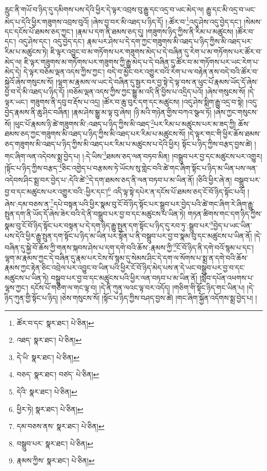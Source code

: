 རླུང་ནི་གཡོ་བ་ཉིད་དུ་དམིགས་པས་དེའི་ཕྱིར་དེ་ལྟར་འབྲས་བུ་རྒྱུ་དང་འདྲ་བ་ཡང་མེད་ལ། རྒྱུ་དང་མི་འདྲ་བ་ཡང་མེད་པ་དེའི་ཕྱིར་གཟུགས་འབྲས་བུའོ། །ཞེས་བྱ་བར་མི་འཐད་པ་ཉིད་དོ། །:ཚོར་བ་\footnote{ཚོར་བ་དང་  སྣར་ཐང་།  པེ་ཅིན། }འདུ་ཤེས་འདུ་བྱེད་དང་། །སེམས་དང་དངོས་པོ་ཐམས་ཅད་ཀྱང་། །རྣམ་པ་དག་ནི་ཐམས་ཅད་དུ། །གཟུགས་ཉིད་ཀྱིས་ནི་རིམ་པ་མཚུངས། །ཚོར་བ་དང་། འདུ་ཤེས་དང་། འདུ་བྱེད་དང་། རྣམ་པར་ཤེས་པ་དེ་དག་ཀྱང་གཟུགས་མི་འཐད་པ་ཉིད་ཀྱིས་མི་འཐད་པར་རིམ་པ་མཚུངས་ཏེ། ཇི་ལྟར་འབྱུང་བ་མ་གཏོགས་པར་གཟུགས་མེད་པ་དེ་བཞིན་དུ་རེག་པ་མ་གཏོགས་པར་ཚོར་བ་མེད་ལ། ཇི་ལྟར་གཟུགས་མ་གཏོགས་པར་གཟུགས་ཀྱི་རྒྱུ་མེད་པ་དེ་བཞིན་དུ་ཚོར་བ་མ་གཏོགས་པར་ཡང་རེག་པ་མེད་དེ། དེ་ལྟར་བཅོམ་ལྡན་འདས་ཀྱིས་ཀྱང་། བདེ་བ་མྱོང་བར་འགྱུར་བའི་རེག་པ་ལ་བརྟེན་ནས་བདེ་བའི་ཚོར་བ་སྐྱེའོ་ཞེས་གསུངས་སོ། །ལྷག་མ་རྣམས་ལ་ཡང་དེ་བཞིན་དུ་སྦྱར་བར་བྱ་སྟེ་དེ་ལྟ་བས་ན་ཕུང་པོ་རྣམས་ཡོད་དོ་ཞེས་བྱ་བ་དེ་མི་འཐད་པ་ཉིད་དོ། །བཅོམ་ལྡན་འདས་ཀྱིས་ཀྱང་སྒྱུ་མ་འདི་ནི་བྱིས་པ་འདྲིད་པའོ། །ཞེས་གསུངས་སོ། །དེ་ལྟར་ཡང་། གཟུགས་ནི་དབུ་བ་རྡོས་པ་འདྲ། །ཚོར་བ་ཆུ་བུར་དག་དང་མཚུངས། །འདུ་ཤེས་སྨིག་རྒྱུ་འདྲ་བ་སྟེ། །འདུ་བྱེད་རྣམས་ནི་ཆུ་ཤིང་བཞིན། །རྣམ་ཤེས་སྒྱུ་མ་ལྟ་བུ་ཞེས། །ཉི་མའི་གཉེན་གྱིས་བཀའ་སྩལ་ཏོ། །ཞེས་ཀྱང་གསུངས་སོ། །ཕུང་པོ་རྣམས་ཉི་ཚེ་གཟུགས་མི་:འཐད་པ་ཉིད་ཀྱིས་མི་འཐད་\footnote{འཐད་  སྣར་ཐང་།  པེ་ཅིན། }པར་རིམ་པ་མཚུངས་པར་མ་ཟད་ཀྱི། ཆོས་ཐམས་ཅད་ཀྱང་གཟུགས་མི་འཐད་པ་ཉིད་ཀྱིས་མི་འཐད་པར་རིམ་པ་མཚུངས་སོ། །དེ་ལྟར་གང་གི་ཕྱིར་ཆོས་ཐམས་ཅད་གཟུགས་མི་འཐད་པ་ཉིད་ཀྱིས་མི་འཐད་པར་རིམ་པ་མཚུངས་པ་དེའི་ཕྱིར། སྟོང་པ་ཉིད་ཀྱིས་བརྩད་བྱས་ཚེ། །གང་ཞིག་ལན་འདེབས་སྨྲ་བྱེད་པ། །:དེ་ཡིས་\footnote{དེ་ཡི་  སྣར་ཐང་།  པེ་ཅིན། }ཐམས་ཅད་ལན་བཏབ་མིན། །བསྒྲུབ་པར་བྱ་དང་མཚུངས་པར་འགྱུར། །སྟོང་པ་ཉིད་ཀྱིས་བརྩད་\footnote{བཅད་  སྣར་ཐང་། བཙད་  པེ་ཅིན། }ཅིང་འགྱེད་པ་བརྩམས་ཏེ་ཡོངས་སུ་གླེང་བའི་ཚེ་གང་ཞིག་སྟོང་པ་ཉིད་མ་ཡིན་པས་ལན་འདེབས་ཤིང་སྨྲ་བར་བྱེད་པ་:དེའི་ཚེ་\footnote{དེའི་  སྣར་ཐང་།  པེ་ཅིན། }དེ་དག་ཐམས་ཅད་ནི་ལན་བཏབ་པ་མ་ཡིན་ནོ། །ཅིའི་ཕྱིར་ཞེ་ན། བསྒྲུབ་པར་བྱ་བ་དང་མཚུངས་པར་འགྱུར་བའི་:ཕྱིར་དང་།\footnote{ཕྱིར་ཏེ།  སྣར་ཐང་།  པེ་ཅིན། } འདི་ལྟ་སྟེ་དཔེར་ན་དངོས་པོ་ཐམས་ཅད་ངོ་བོ་ཉིད་སྟོང་པའོ། །ཞེས་:དམ་བཅས་ན་\footnote{དམ་བཅས་ནས་  སྣར་ཐང་།  པེ་ཅིན། }དཔེ་བསྟན་པའི་ཕྱིར་སྣམ་བུ་ངོ་བོ་ཉིད་སྟོང་པར་སྒྲུབ་པར་བྱེད་པའི་ཚེ་གང་ཞིག་རེ་ཞིག་རྒྱུ་སྤུན་དག་ནི་ཡོད་དོ་ཞེས་ཟེར་བའི་དེ་ནི་བསྒྲུབ་པར་བྱ་བ་དང་མཚུངས་པ་ཡིན་ཏེ། གཏན་ཚིགས་གང་དག་ཉིད་ཀྱིས་སྣམ་བུ་ངོ་བོ་ཉིད་སྟོང་པར་བསྟན་པ་དེ་དག་ཉིད་རྒྱུ་སྤུན་དག་སྟོང་པ་ཉིད་དུ་རབ་ཏུ་:སྒྲུབ་པར་\footnote{བསྒྲུབ་པར་  སྣར་ཐང་།  པེ་ཅིན། }བྱེད་པ་ཡང་ཡིན་པས་དེའི་ཕྱིར་རྒྱུ་སྤུན་དག་སྟོང་པ་ཉིད་མ་ཡིན་པར་སྟོན་པ་ནི་བསྒྲུབ་པར་བྱ་བ་སྣམ་བུ་དང་མཚུངས་པ་ཡིན་ནོ། །དེ་བཞིན་དུ་སྐྱེ་བོ་ཆོས་ཀྱི་གནས་སྐབས་ཤེས་པ་དག་དགེ་བའི་ཆོས་:རྣམས་ཀྱི་\footnote{རྣམས་ཀྱིས་  སྣར་ཐང་།  པེ་ཅིན། }ངོ་བོ་ཉིད་ནི་དགེ་བའོ་སྙམ་པ་དང་། ལྷག་མ་རྣམས་ཀྱང་དེ་བཞིན་དུ་རྣམ་པར་ངེས་སོ་སྙམ་དུ་སེམས་ཤིང་དེ་དག་ལ་སོགས་པ་སྨྲ་ན་དགེ་བའི་ཆོས་རྣམས་ཀྱང་རྟེན་ཅིང་འབྲེལ་པར་འབྱུང་བ་ཡིན་པའི་ཕྱིར་ངོ་བོ་ཉིད་མེད་པས་ན་དེ་ཡང་བསྒྲུབ་པར་བྱ་བ་དང་མཚུངས་པ་ཡིན་ཏེ། བསྒྲུབ་པར་བྱ་བ་དང་མཚུངས་པའི་ཕྱིར་ལན་བཏབ་པ་མ་ཡིན་ནོ། །སློབ་དཔོན་འཕགས་པ་ལྷས་ཀྱང་། དངོས་པོ་གཅིག་ལ་གང་ལྟ་བ། །དེ་ནི་ཀུན་ལའང་ལྟ་བར་འདོད། །གཅིག་གི་སྟོང་ཉིད་གང་ཡིན་པ། །དེ་ཉིད་ཀུན་གྱི་སྟོང་པ་ཉིད། །ཅེས་གསུངས་སོ། །སྟོང་པ་ཉིད་ཀྱིས་བཤད་བྱས་ཚེ། །གང་ཞིག་སྐྱོན་འདོགས་སྨྲ་བྱེད་པ། །
